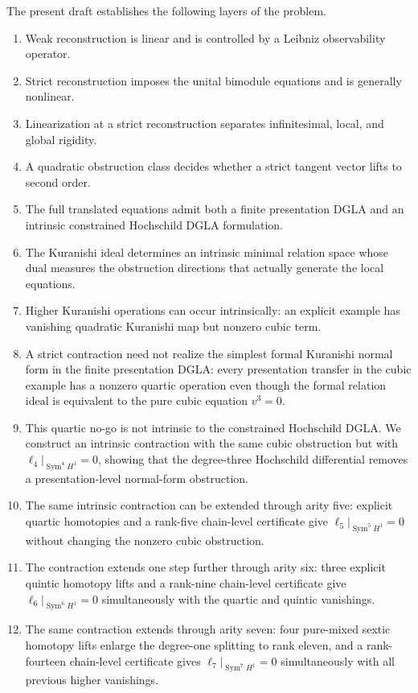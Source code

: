 \documentclass[11pt]{amsart}
\begin{document}
The present draft establishes the following layers of the problem.
\begin{enumerate}[label=(\roman*)]
\item Weak reconstruction is linear and is controlled by a Leibniz observability operator.
\item Strict reconstruction imposes the unital bimodule equations and is generally nonlinear.
\item Linearization at a strict reconstruction separates infinitesimal, local, and global rigidity.
\item A quadratic obstruction class decides whether a strict tangent vector lifts to second order.
\item The full translated equations admit both a finite presentation DGLA and an intrinsic constrained Hochschild DGLA formulation.
\item The Kuranishi ideal determines an intrinsic minimal relation space whose dual measures the obstruction directions that actually generate the local equations.
\item Higher Kuranishi operations can occur intrinsically: an explicit example has vanishing quadratic Kuranishi map but nonzero cubic term.
\item A strict contraction need not realize the simplest formal Kuranishi normal form in the finite presentation DGLA: every presentation transfer in the cubic example has a nonzero quartic operation even though the formal relation ideal is equivalent to the pure cubic equation $v^3=0$.
\item This quartic no-go is not intrinsic to the constrained Hochschild DGLA.  We construct an intrinsic contraction with the same cubic obstruction but with $\ell_4|_{\operatorname{Sym}^4H^1}=0$, showing that the degree-three Hochschild differential removes a presentation-level normal-form obstruction.
\item The same intrinsic contraction can be extended through arity five: explicit quartic homotopies and a rank-five chain-level certificate give $\ell_5|_{\operatorname{Sym}^5H^1}=0$ without changing the nonzero cubic obstruction.
\item The contraction extends one step further through arity six: three explicit quintic homotopy lifts and a rank-nine chain-level certificate give $\ell_6|_{\operatorname{Sym}^6H^1}=0$ simultaneously with the quartic and quintic vanishings.
\item The same contraction extends through arity seven: four pure-mixed sextic homotopy lifts enlarge the degree-one splitting to rank eleven, and a rank-fourteen chain-level certificate gives $\ell_7|_{\operatorname{Sym}^7H^1}=0$ simultaneously with all previous higher vanishings.

\end{enumerate}
\end{document}
